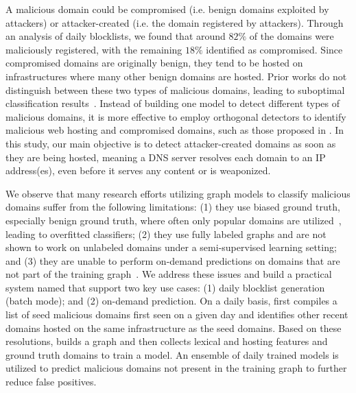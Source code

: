 A malicious domain could be compromised (i.e. benign domains exploited by attackers) or attacker-created (i.e. the domain registered by attackers). Through an analysis of daily blocklists, we found that around $82\%$ of the domains were maliciously registered, with the remaining $18\%$ identified as compromised. Since compromised domains are originally benign, they tend to be hosted on infrastructures where many other benign domains are hosted. Prior works do not distinguish between these two types of malicious domains, leading to suboptimal classification results~\cite{BPPhishingCCS:2022, ringer:ICCS:2020,hgdom:NOMS:2020}. 
Instead of building one model to detect different types of malicious domains, it is more effective to employ orthogonal detectors to identify malicious web hosting and compromised domains, such as those proposed in \cite{comp_or_at:2021:usenix}. In this study, our main objective is to detect attacker-created domains as soon as they are being hosted, meaning a DNS server resolves each domain to an IP address(es), even before it serves any content or is weaponized.

We observe that many research efforts utilizing graph models to classify malicious domains suffer from the following limitations: (1) they use biased ground truth, especially benign ground truth, where often only popular domains are utilized~\cite{Bahnsen:2017:PhishingURLsNN, practicalattacks:SP:2024}, leading to overfitted classifiers; (2) they use fully labeled graphs and are not shown to work on unlabeled domains under a semi-supervised learning setting; 
and (3) they are unable to perform on-demand predictions on domains that are not part of the training graph~\cite{BPPhishingCCS:2022, bp_mal2:2020}. 
We address these issues and build a practical system named \system
that support two key use cases: (1) daily blocklist generation (batch mode); and (2) on-demand prediction. On a daily basis, \system first compiles a list of seed malicious domains first seen on a given day and identifies other recent domains hosted on the same infrastructure as the seed domains.
Based on these resolutions, \system builds a graph and then collects lexical and hosting features and ground truth domains to train a model. 
An ensemble of daily trained models is utilized to predict malicious domains not present in the training graph to further reduce false positives. 

